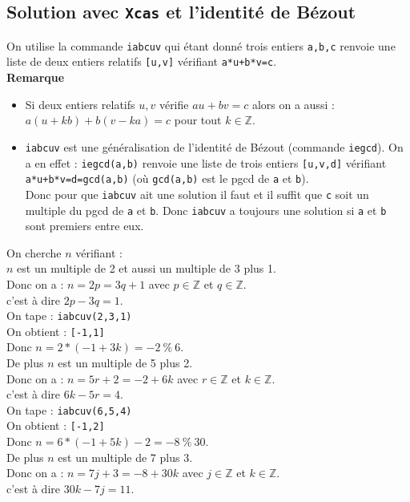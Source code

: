 \documentclass[a4paper,11pt]{book}
\newcommand{\Z}{{\mathbb{Z}}}
\begin{document}
\subsection{Solution avec {\tt Xcas} et l'identit\'e de B\'ezout}
On utilise la commande {\tt iabcuv} qui \'etant donn\'e trois entiers
{\tt a,b,c} renvoie une liste de deux entiers 
relatifs {\tt [u,v]} v\'erifiant {\tt a*u+b*v=c}.\\
{\bf Remarque} 
\begin{itemize}
\item Si deux entiers 
  relatifs $u,v$ v\'erifie $au+bv=c$ alors on a aussi :\\
  $a(u+kb)+b(v-ka)=c$ pour tout $k \in \Z$.
\item {\tt iabcuv} est une g\'en\'eralisation de l'identit\'e de B\'ezout
  (commande {\tt iegcd}). On a en effet :
  {\tt iegcd(a,b)} renvoie une liste de trois entiers {\tt [u,v,d]} 
  v\'erifiant {\tt a*u+b*v=d=gcd(a,b)} (o\`u {\tt gcd(a,b)} est
  le  pgcd de {\tt a} et {\tt b}).\\
  Donc pour que {\tt iabcuv} ait une solution il faut et il 
  suffit que {\tt c} soit un multiple du pgcd de {\tt a} et {\tt b}.
  Donc {\tt iabcuv} a toujours une solution si {\tt a} et {\tt b} sont premiers 
  entre eux.
\end{itemize}
On cherche $n$ v\'erifiant :\\
$n$ est un multiple de 2 et aussi un  multiple de 3 plus 1. \\
Donc on a : $n=2p=3q+1$ avec $p\in \Z$ et $q\in \Z$.\\
c'est \`a dire $2p-3q=1$.\\
On tape : {\tt iabcuv(2,3,1)}\\
On obtient : {\tt [-1,1]}\\
Donc $n=2*(-1+3k)=-2\ \%\ 6$.\\
De plus $n$ est un multiple de 5 plus 2.\\
Donc on a : $n=5r+2=-2+6k$ avec $r\in \Z$ et $k\in \Z$.\\
c'est \`a dire $6k-5r=4$.\\
On tape : {\tt iabcuv(6,5,4)}\\
On obtient : {\tt [-1,2]}\\
Donc $n=6*(-1+5k)-2=-8\ \%\  30$.\\
De plus $n$ est un multiple de 7 plus 3.\\
Donc on a : $n=7j+3=-8+30k$ avec $j\in \Z$ et $k\in \Z$.\\
c'est \`a dire $30k-7j=11$.\\
\end{document}
